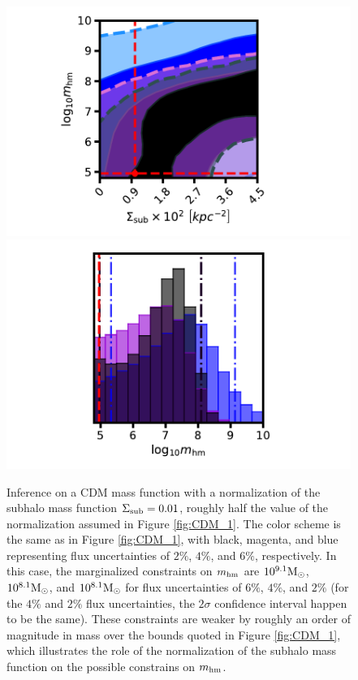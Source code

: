 \begin{figure}
	\includegraphics[clip,trim=2cm 0cm 3.5cm
	0.25cm,width=.48\textwidth,keepaspectratio]{./figures_LOSforward/CDM_lownorm_joint.pdf}
	\includegraphics[clip,trim=2cm 0cm 3.5cm
	0.5cm,width=.48\textwidth,keepaspectratio]{./figures_LOSforward/CDM_lownorm_mhm.pdf}
	\caption[Joint posterior distribution of the normalization of the SHMF and the half-mode mass from CDM mock data]{\label{fig:fluxuncertainties_CDM1} Inference on a CDM mass function with a normalization of the subhalo mass function $\Sigma_{\rm{sub}} = 0.01$, roughly half the value of the normalization assumed in Figure \ref{fig:CDM_1}. The color scheme is the same as in Figure \ref{fig:CDM_1}, with black, magenta, and blue representing flux uncertainties of $2\%$, $4\%$, and $6\%$, respectively. In this case, the marginalized constraints on ${m_{\rm{hm}}}$ are $10^{9.1} {\rm{M}_{\odot}}$, $10^{8.1} {\rm{M}_{\odot}}$, and $10^{8.1} {\rm{M}_{\odot}}$ for flux uncertainties of $6 \%$, $4\%$, and $2 \%$ (for the $4\%$ and $2\%$ flux uncertainties, the $2 \sigma$ confidence interval happen to be the same). These constraints are weaker by roughly an order of magnitude in mass over the bounds quoted in Figure \ref{fig:CDM_1}, which illustrates the role of the normalization of the subhalo mass function on the possible constrains on ${m_{\rm{hm}}}$.}
\end{figure}	
